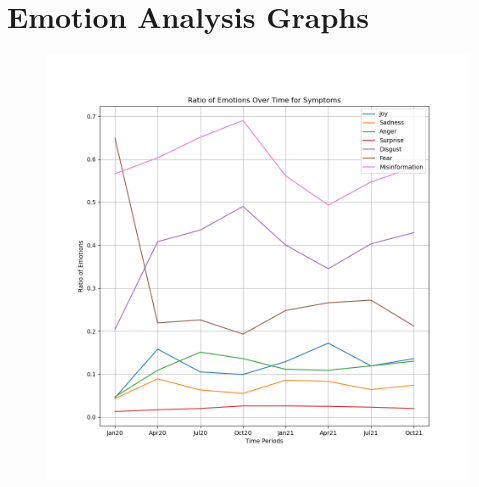 \documentclass{l4proj}
\begin{document}
\begin{appendices}
\begin{figure}[H]
\begin{minipage}[c]{0.49\linewidth}
\label{fig:polsen}
\end{minipage}
\end{figure}

\chapter{Emotion Analysis Graphs}

\begin{figure}[H]
\begin{minipage}[c]{0.49\linewidth}
\centering
\includegraphics[width=\textwidth]{images/SymptomsEmotion.png}
\label{fig:sympemo}
\end{minipage}
\begin{minipage}[c]{0.49\linewidth}
\centering

\end{minipage}
\end{figure}
\end{appendices}
\end{document}

